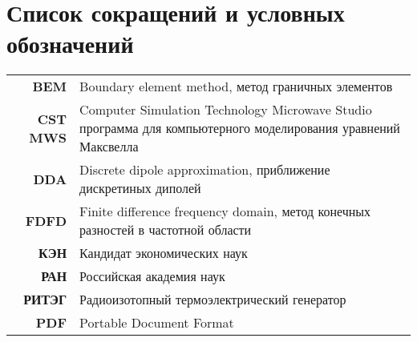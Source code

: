 \chapter*{Список сокращений и условных обозначений}             %
\noindent
\begin{tabularx}{\textwidth}{r X}
  \textbf{BEM} & Boundary element method, метод граничных элементов\\
  \textbf{CST MWS} & Computer Simulation Technology Microwave Studio
  программа для компьютерного моделирования уравнений Максвелла\\
  \textbf{DDA} & Discrete dipole approximation, приближение дискретиных диполей\\
  \textbf{FDFD} & Finite difference frequency domain, метод конечных
  разностей в частотной области\\
  \textbf{КЭН} & Кандидат экономических наук\\
  \textbf{РАН} & Российская академия наук\\
  \textbf{РИТЭГ} & Радиоизотопный термоэлектрический генератор\\
  \textbf{PDF} & Portable Document Format\\
\end{tabularx}
